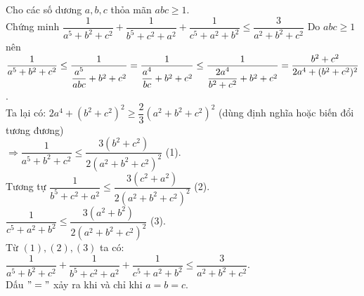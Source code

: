 \begin{ex}%
    Cho các số dương $a, b, c$ thỏa mãn $abc \ge 1$.\\
Chứng minh $\dfrac{1}{a^5+b^2+c^2}+\dfrac{1}{b^5+c^2+a^2}+\dfrac{1}{c^5+a^2+b^2} \le \dfrac{3}{a^2+b^2+c^2}$
\loigiai
    {
Do $abc \ge 1$ nên $\dfrac{1}{a^5+b^2+c^2} \le \dfrac{1}{\dfrac{a^5}{abc}+b^2+c^2} \\
= \dfrac{1}{\dfrac{a^4}{bc}+b^2+c^2} \le \dfrac{1}{\dfrac{2a^4}{b^2+c^2}+b^2+c^2}=\dfrac{b^2+c^2}{2a^4+(b^2+c^2)^2}$ .\\
Ta lại có: $2a^4+(b^2+c^2)^2 \ge \dfrac{2}{3}(a^2+b^2+c^2)^2$ (dùng định nghĩa hoặc biến đổi tương đương)\\
$\Rightarrow \dfrac{1}{a^5+b^2+c^2} \le \dfrac{3(b^2+c^2)}{2(a^2+b^2+c^2)^2}$ (1).\\
Tương tự $\dfrac{1}{b^5+c^2+a^2} \le \dfrac{3(c^2+a^2)}{2(a^2+b^2+c^2)^2}$ (2).\\
$\dfrac{1}{c^5+a^2+b^2} \le \dfrac{3(a^2+b^2)}{2(a^2+b^2+c^2)^2}$ (3).\\
Từ $(1), (2), (3)$ ta có:
$\dfrac{1}{a^5+b^2+c^2}+\dfrac{1}{b^5+c^2+a^2}+\dfrac{1}{c^5+a^2+b^2} \le \dfrac{3}{a^2+b^2+c^2}$.\\
Dấu $"="$ xảy ra khi và chỉ khi $a = b = c$.
    }
\end{ex}

